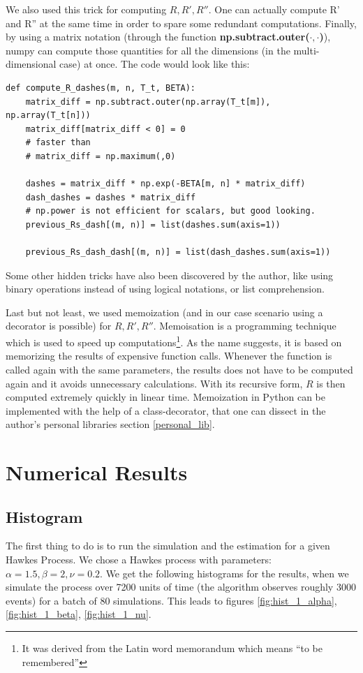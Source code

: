 We also used this trick for computing $R,R',R''$. One can actually compute R' and R'' at the same time in order to spare some redundant computations. Finally, by using a matrix notation (through the function \textbf{np.subtract.outer($\cdot,\cdot$)}), numpy can compute those quantities for all the dimensions (in the multi-dimensional case) at once. The code would look like this:

\begin{verbatim}
def compute_R_dashes(m, n, T_t, BETA):
    matrix_diff = np.subtract.outer(np.array(T_t[m]), np.array(T_t[n]))
    matrix_diff[matrix_diff < 0] = 0
    # faster than
    # matrix_diff = np.maximum(,0)

    dashes = matrix_diff * np.exp(-BETA[m, n] * matrix_diff)
    dash_dashes = dashes * matrix_diff
    # np.power is not efficient for scalars, but good looking.
    previous_Rs_dash[(m, n)] = list(dashes.sum(axis=1))

    previous_Rs_dash_dash[(m, n)] = list(dash_dashes.sum(axis=1))
\end{verbatim}

Some other hidden tricks have also been discovered by the author, like using binary operations instead of using logical notations, or list comprehension.

Last but not least, we used memoization (and in our case scenario using a decorator is possible) for $R,R',R''$. Memoisation is a programming technique which is used to speed up computations\footnote{It was derived from the Latin word memorandum which means “to be remembered”}. As the name suggests, it is based on memorizing the results of expensive function calls. Whenever the function is called again with the same parameters, the results does not have to be computed again and it avoids unnecessary calculations. With its recursive form, $R$ is then computed extremely quickly in linear time. Memoization in Python can be implemented with the help of a class-decorator, that one can dissect in the author's personal libraries section \ref{personal_lib}. 




\section{Numerical Results}



\subsection{Histogram}
The first thing to do is to run the simulation and the estimation for a given Hawkes Process. We chose a Hawkes process with parameters: $\alpha = 1.5, \beta = 2, \nu = 0.2$. We get the following histograms for the results, when we simulate the process over 7200 units of time (the algorithm observes roughly 3000 events) for a batch of 80 simulations. This leads to figures \ref{fig:hist_1_alpha}, \ref{fig:hist_1_beta}, \ref{fig:hist_1_nu}.


